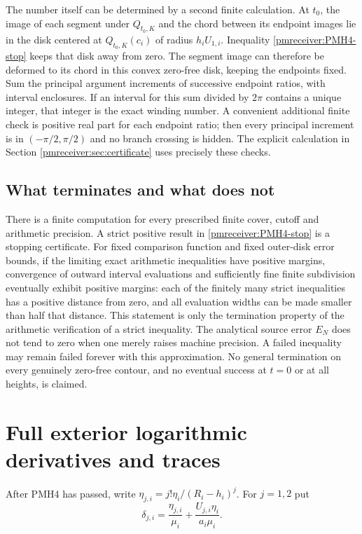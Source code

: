 \documentclass[11pt]{article}
\begin{document}
The number itself can be determined by a second finite calculation.
At $t_0$, the image of each segment under $Q_{t_0,K}$ and the chord
between its endpoint images lie in the disk centered at
$Q_{t_0,K}(c_i)$ of radius $h_iU_{1,i}$. Inequality
\eqref{pmreceiver:PMH4-stop} keeps that disk away from zero. The segment image
can therefore be deformed to its chord in this convex zero-free disk,
keeping the endpoints fixed. Sum the principal argument increments
of successive endpoint ratios, with interval enclosures. If an
interval for this sum divided by $2\pi$ contains a unique integer,
that integer is the exact winding number. A convenient additional
finite check is positive real part for each endpoint ratio; then
every principal increment is in $(-\pi/2,\pi/2)$ and no branch
crossing is hidden. The explicit calculation in Section
\ref{pmreceiver:sec:certificate} uses precisely these checks.

\subsection{What terminates and what does not}

There is a finite computation for every prescribed finite cover,
cutoff and arithmetic precision. A strict positive result in
\eqref{pmreceiver:PMH4-stop} is a stopping certificate. For fixed comparison
function and fixed outer-disk error bounds, if the limiting exact
arithmetic inequalities have positive margins, convergence of
outward interval evaluations and sufficiently fine finite
subdivision eventually exhibit positive margins: each of the
finitely many strict inequalities has a positive distance from
zero, and all evaluation widths can be made smaller than half that
distance. This statement is only the termination property of the
arithmetic verification of a strict inequality.
The analytical source error $E_N$ does not tend to zero when one
merely raises machine precision. A failed inequality may remain
failed forever with this approximation. No general termination on
every genuinely zero-free contour, and no eventual success at
$t=0$ or at all heights, is claimed.

\section{Full exterior logarithmic derivatives and traces}

After PMH4 has passed, write $\eta_{j,i}=j!\eta_i/(R_i-h_i)^j$.
For $j=1,2$ put
\begin{equation}\label{pmreceiver:PMH5-delta}
 \delta_{j,i}=\frac{\eta_{j,i}}{\mu_i}
       +\frac{U_{j,i}\eta_i}{a_i\mu_i}.
\end{equation}
\end{document}
